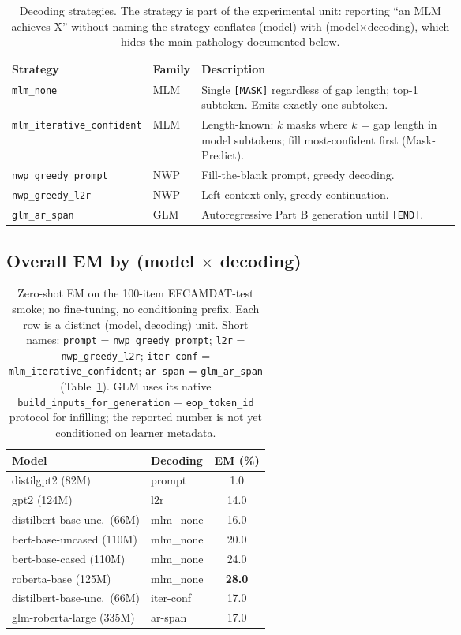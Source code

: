 \documentclass[11pt]{article}
\begin{document}
\begin{table}[t]
\centering\footnotesize
\begin{tabular}{@{}llp{0.66\linewidth}@{}}
\toprule
Strategy & Family & Description \\
\midrule
\texttt{mlm\_none} & MLM & Single \texttt{[MASK]} regardless of gap length; top-1 subtoken. Emits exactly one subtoken. \\
\texttt{mlm\_iterative\_confident} & MLM & Length-known: $k$ masks where $k$ = gap length in model subtokens; fill most-confident first (Mask-Predict). \\
\texttt{nwp\_greedy\_prompt} & NWP & Fill-the-blank prompt, greedy decoding. \\
\texttt{nwp\_greedy\_l2r} & NWP & Left context only, greedy continuation. \\
\texttt{glm\_ar\_span} & GLM & Autoregressive Part B generation until \texttt{[END]}. \\
\bottomrule
\end{tabular}
\caption{Decoding strategies. The strategy is part of the experimental
unit: reporting ``an MLM achieves X'' without naming the strategy conflates
(model) with (model$\times$decoding), which hides the main pathology
documented below.}
\label{tab:strategies}
\end{table}

\subsection{Overall EM by (model $\times$ decoding)}

\begin{table}[t]
\centering\scriptsize
\setlength{\tabcolsep}{3pt}
\begin{tabular}{@{}llc@{}}
\toprule
Model & Decoding & EM (\%) \\
\midrule
distilgpt2 (82M)          & prompt    &  1.0 \\
gpt2 (124M)               & l2r       & 14.0 \\
distilbert-base-unc.\ (66M)   & mlm\_none & 16.0 \\
bert-base-uncased (110M)  & mlm\_none & 20.0 \\
bert-base-cased (110M)    & mlm\_none & 24.0 \\
roberta-base (125M)       & mlm\_none & \textbf{28.0} \\
distilbert-base-unc.\ (66M)   & iter-conf & 17.0 \\
glm-roberta-large (335M)  & ar-span   & 17.0 \\
\bottomrule
\end{tabular}
\caption{Zero-shot EM on the 100-item EFCAMDAT-test smoke; no
fine-tuning, no conditioning prefix. Each row is a distinct
(model, decoding) unit. Short names: \texttt{prompt} =
\texttt{nwp\_greedy\_prompt}; \texttt{l2r} = \texttt{nwp\_greedy\_l2r};
\texttt{iter-conf} = \texttt{mlm\_iterative\_confident};
\texttt{ar-span} = \texttt{glm\_ar\_span}
(Table~\ref{tab:strategies}). GLM uses its native
\texttt{build\_inputs\_for\_generation} + \texttt{eop\_token\_id} protocol
for infilling; the reported number is not yet conditioned on learner
metadata.}
\label{tab:diagnosis}
\end{table}
\end{document}

